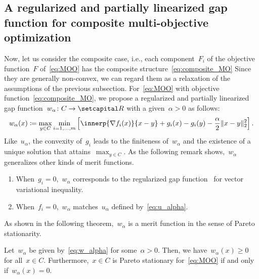 \documentclass[../../main]{subfiles}
\begin{document}
\subsection{A regularized and partially linearized gap function for composite multi-objective optimization} \label{sec:merit:merit:reg_lin_gap}
Now, let us consider the composite case, i.e., each component~$F_i$ of the objective function~$F$ of~\cref{eq:MOO} has the composite structure~\cref{eq:composite_MO}
Since they are generally non-convex, we can regard them as a relaxation of the assumptions of the previous subsection.
For~\cref{eq:MOO} with objective function~\cref{eq:composite_MO}, we propose a regularized and partially linearized gap function~$w_\alpha \colon C \to \setR$ with a given~$\alpha > 0$ as follows:
\begin{equation} \label{eq:w_alpha}
    w_\alpha(x) \coloneqq \max_{y \in C} \min_{i = 1, \dots, m} \left[ \innerp{\nabla f_i(x)}{x - y} + g_i(x) - g_i(y) - \frac{\alpha}{2} \norm{x - y}_2^2 \right] 
.\end{equation} 
Like~$u_\alpha$, the convexity of~$g_i$ leads to the finiteness of~$w_\alpha$ and the existence of a unique solution that attains~$\max_{y \in C}$.
As the following remark shows,~$w_\alpha$ generalizes other kinds of merit functions.
\begin{remark} \label{rem:composite ref}
    \begin{enumerate}
        \item When~$g_i = 0$,~$w_\alpha$ corresponds to the regularized gap function~\cite{Charitha2010} for vector variational inequality.
        \item When~$f_i = 0$,~$w_\alpha$ matches~$u_\alpha$ defined by~\cref{eq:u_alpha}. \label{enum:w u correspond}
    \end{enumerate}
\end{remark}
As shown in the following theorem,~$w_\alpha$ is a merit function in the sense of Pareto stationarity.
\begin{theorem} \label{thm:w ell}
    Let~$w_\alpha$ be given by~\cref{eq:w_alpha} for some~$\alpha > 0$.
    Then, we have~$w_\alpha(x) \ge 0$ for all~$x \in C$.
    Furthermore,~$x \in C$ is Pareto stationary for~\cref{eq:MOO} if and only if~$w_\alpha(x) = 0$.
\end{theorem}
\end{document}
